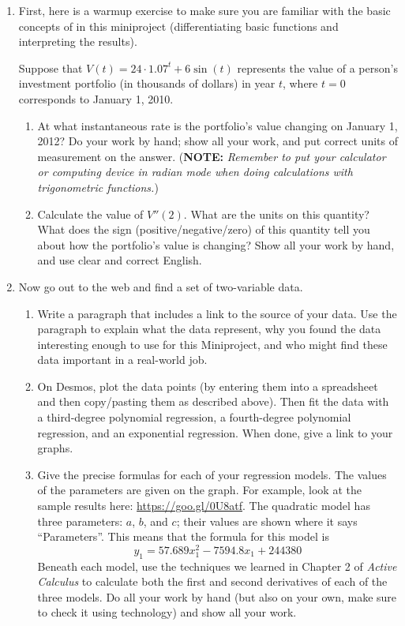 \documentclass[11pt,letterpaper]{article}
\begin{document}
\begin{enumerate}
	\item First, here is a warmup exercise to make sure you are familiar with the basic concepts of in this miniproject (differentiating basic functions and interpreting the results). 

	Suppose that $V(t) = 24 \cdot 1.07^t + 6 \sin(t)$ represents the value of a person's investment portfolio (in thousands of dollars) in year $t$, where $t=0$ corresponds to January 1, 2010. 

	\begin{enumerate}
		\item At what instantaneous rate is the portfolio's value changing on January 1, 2012? Do your work by hand; show all your work, and put correct units of measurement on the answer. (\textbf{NOTE:} \emph{Remember to put your calculator or computing device in radian mode when doing calculations with trigonometric functions.})
		\item Calculate the value of $V''(2)$. What are the units on this quantity? What does the sign (positive/negative/zero) of this quantity tell you about how the portfolio's value is changing? Show all your work by hand, and use clear and correct English. 
	\end{enumerate}
	

	\item Now go out to the web and find a set of two-variable data. 
		\begin{enumerate}
			\item Write a paragraph that includes a link to the source of your data. Use the paragraph to explain what the data represent, why you found the data interesting enough to use for this Miniproject, and who might find these data important in a real-world job. 
			\item On Desmos, plot the data points (by entering them into a spreadsheet and then copy/pasting them as described above). Then fit the data with a third-degree polynomial regression, a fourth-degree polynomial regression, and an exponential regression. When done, give a link to your graphs.
			\item Give the precise formulas for each of your regression models. The values of the parameters are given on the graph. For example, look at the sample results here: \url{https://goo.gl/0U8atf}. The quadratic model has three parameters: $a$, $b$, and $c$; their values are shown where it says ``Parameters''. This means that the formula for this model is
				$$y_1 = 57.689x_1^2 - 7594.8x_1 + 244380$$ 
			Beneath each model, use the techniques we learned in Chapter 2 of \textit{Active Calculus} to calculate both the first and second derivatives of each of the three models. Do all your work by hand (but also on your own, make sure to check it using technology) and show all your work. 


\end{enumerate}
\end{enumerate}
\end{document}

